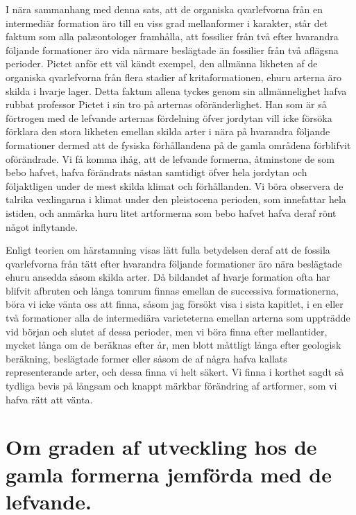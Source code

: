 I nära sammanhang med denna sats, att de organiska qvarlefvorna från en intermediär formation äro till en viss grad mellanformer i karakter, står det faktum som alla palæontologer framhålla, att fossilier från två efter hvarandra följande formationer äro vida närmare beslägtade än fossilier från två aflägsna perioder. Pictet anför ett väl kändt exempel, den allmänna likheten af de organiska qvarlefvorna från flera stadier af kritaformationen, ehuru arterna äro skilda i hvarje lager. Detta faktum allena tyckes genom sin allmännelighet hafva rubbat professor Pictet i sin tro på arternas oföränderlighet. Han som är så förtrogen med de lefvande arternas fördelning öfver jordytan vill icke försöka förklara den stora likheten emellan skilda arter i nära på hvarandra följande formationer dermed att de fysiska förhållandena på de gamla områdena förblifvit oförändrade. Vi få komma ihåg, att de lefvande formerna, åtminstone de som bebo hafvet, hafva förändrats nästan samtidigt öfver hela jordytan och följaktligen under de mest skilda klimat och förhållanden. Vi böra observera de talrika vexlingarna i klimat under den pleistocena perioden, som innefattar hela istiden, och anmärka huru litet artformerna som bebo hafvet hafva deraf rönt något inflytande.

Enligt teorien om härstamning visas lätt fulla betydelsen deraf att de fossila qvarlefvorna från tätt efter hvarandra följande formationer äro nära beslägtade ehuru ansedda såsom skilda arter. Då bildandet af hvarje formation ofta har blifvit afbruten och långa tomrum finnas emellan de successiva formationerna, böra vi icke vänta oss att finna, såsom jag försökt visa i sista kapitlet, i en eller två formationer alla de intermediära varieteterna emellan arterna som uppträdde vid början och slutet af dessa perioder, men vi böra finna efter mellantider, mycket långa om de beräknas efter år, men blott måttligt långa efter geologisk beräkning, beslägtade former eller såsom de af några hafva kallats representerande arter, och dessa finna vi helt säkert. Vi finna i korthet sagdt så tydliga bevis på långsam och knappt märkbar förändring af artformer, som vi hafva rätt att vänta.



\section[Utveckling hos gamla och nya former]{Om graden af utveckling hos de gamla formerna
jemförda med de lefvande.}


